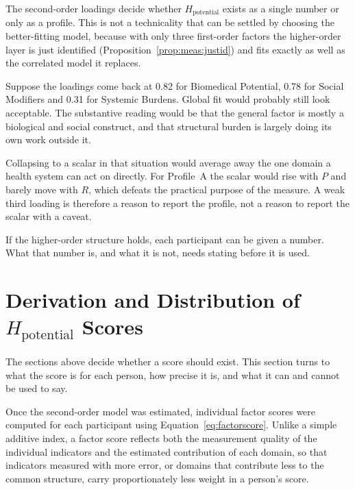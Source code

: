 \begin{reading}
The second-order loadings decide whether $H_{\text{potential}}$ exists as a
single number or only as a profile. This is not a technicality that can be
settled by choosing the better-fitting model, because with only three
first-order factors the higher-order layer is just identified
(Proposition~\ref{prop:meas:justid}) and fits exactly as well as the
correlated model it replaces.

Suppose the loadings come back at 0.82 for Biomedical Potential, 0.78 for
Social Modifiers and 0.31 for Systemic Burdens. Global fit would probably still
look acceptable. The substantive reading would be that the general factor is
mostly a biological and social construct, and that structural burden is largely
doing its own work outside it.

Collapsing to a scalar in that situation would average away the one domain a
health system can act on directly. For Profile~A the scalar would rise with
$P$ and barely move with $R$, which defeats the practical purpose of the
measure. A weak third loading is therefore
a reason to report the profile, not a reason to report the scalar with a
caveat.
\end{reading}

If the higher-order structure holds, each participant can be given a number.
What that number is, and what it is not, needs stating before it is used.

\section{Derivation and Distribution of $H_{\text{potential}}$ Scores}
\label{sec:anal-scores}
The sections above decide whether a score should exist. This section turns to what the score is for each person, how precise it is, and what it can and cannot be used to say.

Once the second-order model was estimated, individual factor scores were computed for each participant using Equation~\eqref{eq:factorscore}. Unlike a simple additive index, a factor score reflects both the measurement quality of the individual indicators and the estimated contribution of each domain, so that indicators measured with more error, or domains that contribute less to the common structure, carry proportionately less weight in a person's score.

